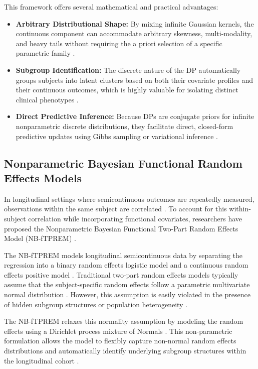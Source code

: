 This framework offers several mathematical and practical advantages:
\begin{itemize}
    \item \textbf{Arbitrary Distributional Shape:} By mixing infinite Gaussian kernels, the continuous component can accommodate arbitrary skewness, multi-modality, and heavy tails without requiring the a priori selection of a specific parametric family \cite{neelon2010, neelon2019}.
    \item \textbf{Subgroup Identification:} The discrete nature of the DP automatically groups subjects into latent clusters based on both their covariate profiles and their continuous outcomes, which is highly valuable for isolating distinct clinical phenotypes \cite{neelon2010, subgroup_bnp}.
    \item \textbf{Direct Predictive Inference:} Because DPs are conjugate priors for infinite nonparametric discrete distributions, they facilitate direct, closed-form predictive updates using Gibbs sampling or variational inference \cite{neal2000, blei2006, ishwaran2001}.
\end{itemize}

\subsection{Nonparametric Bayesian Functional Random Effects Models}

In longitudinal settings where semicontinuous outcomes are repeatedly measured, observations within the same subject are correlated \cite{subgroup_bnp, wang2015}. To account for this within-subject correlation while incorporating functional covariates, researchers have proposed the Nonparametric Bayesian Functional Two-Part Random Effects Model (NB-fTPREM) \cite{subgroup_bnp, wang2015}.

The NB-fTPREM models longitudinal semicontinuous data by separating the regression into a binary random effects logistic model and a continuous random effects positive model \cite{subgroup_bnp, wang2015}. Traditional two-part random effects models typically assume that the subject-specific random effects follow a parametric multivariate normal distribution \cite{subgroup_bnp}. However, this assumption is easily violated in the presence of hidden subgroup structures or population heterogeneity \cite{subgroup_bnp}. 

The NB-fTPREM relaxes this normality assumption by modeling the random effects using a Dirichlet process mixture of Normals \cite{subgroup_bnp}. This non-parametric formulation allows the model to flexibly capture non-normal random effects distributions and automatically identify underlying subgroup structures within the longitudinal cohort \cite{subgroup_bnp, wang2015}.

